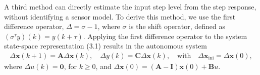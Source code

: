 \documentclass[11pt]{article}
\begin{document}
\begin{itemize}
    \color{blue}
    A third method can directly estimate the input step level from the step response, without identifying a sensor model.
    To derive this method, we use the first difference operator, $\Delta = \sigma - 1$, where $\sigma$ is the shift operator, defined as $(\sigma^\tau y) (k) = y(k + \tau)$.
    Applying the first difference operator to the system state-space representation (3.1) results in the autonomous system
    \begin{equation} \tag{3.11} \begin{aligned} \Delta \mathbf{x}(k+1) = \mathbf{A} \Delta \mathbf{x}(k), \quad \Delta {y}(k) = \mathbf{C} \Delta \mathbf{x}(k), \quad \text{with} \quad \Delta \mathbf{x}_{\text{ini}} = \Delta \mathbf{x}(0) , \label{eqn:ssalti} \end{aligned} \end{equation}
    where $\Delta {u}(k) = \mathbf{0}$, for $k \geq 0$, and
    $\Delta \mathbf{x}(0) = (\mathbf{A} - \mathbf{I}) \mathbf{x}(0) + \mathbf{B} {{u}}$.


\end{itemize}
\end{document}
